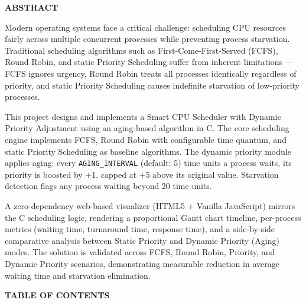 \documentclass[12pt,a4paper]{report}
\begin{document}
\newpage
\thispagestyle{plain}
\label{abstract}

\begin{center}
{\fontsize{16pt}{20pt}\selectfont \textbf{ABSTRACT}\par}
\end{center}

\vspace{0.8cm}

Modern operating systems face a critical challenge: scheduling CPU resources fairly across multiple concurrent processes while preventing process starvation. Traditional scheduling algorithms such as First-Come-First-Served (FCFS), Round Robin, and static Priority Scheduling suffer from inherent limitations --- FCFS ignores urgency, Round Robin treats all processes identically regardless of priority, and static Priority Scheduling causes indefinite starvation of low-priority processes.

This project designs and implements a Smart CPU Scheduler with Dynamic Priority Adjustment using an aging-based algorithm in C. The core scheduling engine implements FCFS, Round Robin with configurable time quantum, and static Priority Scheduling as baseline algorithms. The dynamic priority module applies aging: every \texttt{AGING\_INTERVAL} (default: 5) time units a process waits, its priority is boosted by +1, capped at +5 above its original value. Starvation detection flags any process waiting beyond 20 time units.

A zero-dependency web-based visualizer (HTML5 + Vanilla JavaScript) mirrors the C scheduling logic, rendering a proportional Gantt chart timeline, per-process metrics (waiting time, turnaround time, response time), and a side-by-side comparative analysis between Static Priority and Dynamic Priority (Aging) modes. The solution is validated across FCFS, Round Robin, Priority, and Dynamic Priority scenarios, demonstrating measurable reduction in average waiting time and starvation elimination.

\newpage
\begin{center}
{\fontsize{14pt}{18pt}\selectfont \textbf{TABLE OF CONTENTS}\par}
\end{center}
\end{document}
